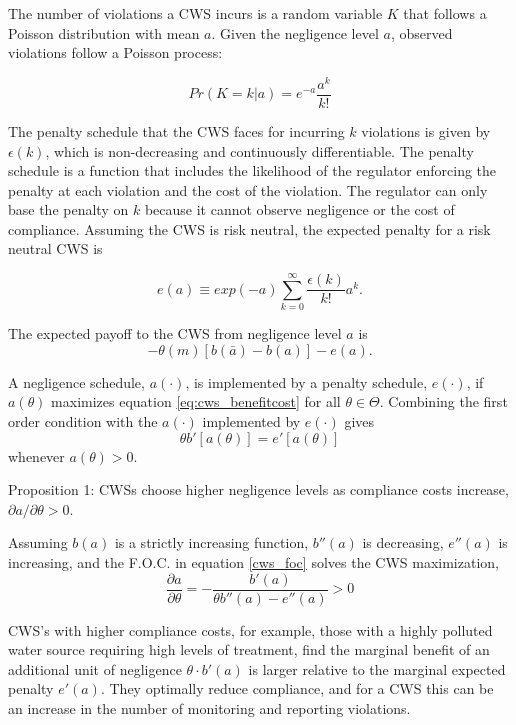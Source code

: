 \documentclass{article}
\begin{document}
The number of violations a CWS incurs is a random variable $K$ that follows a Poisson distribution with mean $a$. Given the negligence level $a$, observed violations follow a Poisson process:

\[Pr(K = k | a) = e^{-a}  \frac{a^k}{k!}\]

The penalty schedule that the CWS faces for incurring $k$ violations is given by $\epsilon(k)$, which is non-decreasing and continuously differentiable. The penalty schedule is a function that includes the likelihood of the regulator enforcing the penalty at each violation and the cost of the violation. The regulator can only base the penalty on $k$ because it cannot observe negligence or the cost of compliance. Assuming the CWS is risk neutral, the expected penalty for a risk neutral CWS is 

\begin{equation}
    e(a)\equiv exp(-a)\sum^\infty_{k=0}\frac{\epsilon(k)}{k!}a^k.
\end{equation}

The expected payoff to the CWS from negligence level $a$ is
\begin{equation}\label{eq:cws_benefitcost}
    -\theta(m)[b(\bar{a})-b(a)]-e(a).
\end{equation}

A negligence schedule, $a(\cdot)$, is implemented by a penalty schedule, $e(\cdot)$, if $a(\theta)$ maximizes equation \ref{eq:cws_benefitcost} for all $\theta \in \Theta$. Combining the first order condition with the $a(\cdot)$ implemented by $e(\cdot)$ gives
\begin{equation}\label{cws_foc}
    \theta b'[a(\theta)]=e'[a(\theta)]
\end{equation}
whenever $a(\theta)>0$.

Proposition 1: CWSs choose higher negligence levels as compliance costs increase, $\partial a/ \partial \theta>0$.

Assuming $b(a)$ is a strictly increasing function, $b''(a)$ is decreasing, $e''(a)$ is increasing, and the F.O.C. in equation \ref{cws_foc} solves the CWS maximization,
\[\frac{\partial a}{\partial \theta}=-\frac{b'(a)}{\theta b''(a)-e''(a)}>0\]

CWS's with higher compliance costs, for example, those with a highly polluted water source requiring high levels of treatment, find the marginal benefit of an additional unit of negligence $\theta·b'(a)$ is larger relative to the marginal expected penalty $e'(a)$. They optimally reduce compliance, and for a CWS this can be an increase in the number of monitoring and reporting violations.
\end{document}
